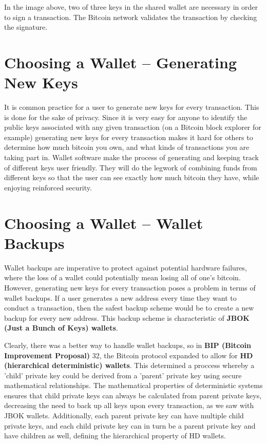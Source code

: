 \documentclass[11pt]{article}
\begin{document}
    In the image above, two of three keys in the shared wallet are necessary in order to sign a transaction. The Bitcoin network validates the transaction by checking the signature.
    
    \section*{Choosing a Wallet -- Generating New Keys}
    
    It is common practice for a user to generate new keys for every transaction. This is done for the sake of privacy. Since it is very easy for anyone to identify the public keys associated with any given transaction (on a Bitcoin block explorer for example) generating new keys for every transaction makes it hard for others to determine how much bitcoin you own, and what kinds of transactions you are taking part in. Wallet software make the process of generating and keeping track of different keys user friendly. They will do the legwork of combining funds from different keys so that the user can see exactly how much bitcoin they have, while enjoying reinforced security. 
    
    \section*{Choosing a Wallet -- Wallet Backups}
    
    Wallet backups are imperative to protect against potential hardware failures, where the loss of a wallet could potentially mean losing all of one's bitcoin. However, generating new keys for every transaction poses a problem in terms of wallet backups. If a user generates a new address every time they want to conduct a transaction, then the safest backup scheme would be to create a new backup for every new address. This backup scheme is characteristic of \textbf{JBOK (Just a Bunch of Keys) wallets}.
    
    Clearly, there was a better way to handle wallet backups, so in \textbf{BIP (Bitcoin Improvement Proposal)} 32, the Bitcoin protocol expanded to allow for \textbf{HD (hierarchical deterministic) wallets}. This determined a proccess whereby a 'child' private key could be derived from a 'parent' private key using secure mathematical relationships. The mathematical properties of deterministic systems ensures that child private keys can always be calculated from parent private keys, decreasing the need to back up all keys upon every transaction, as we saw with JBOK wallets. Additionally, each parent private key can have multiple child private keys, and each child private key can in turn be a parent private key and have children as well, defining the hierarchical property of HD wallets.  
\end{document}
